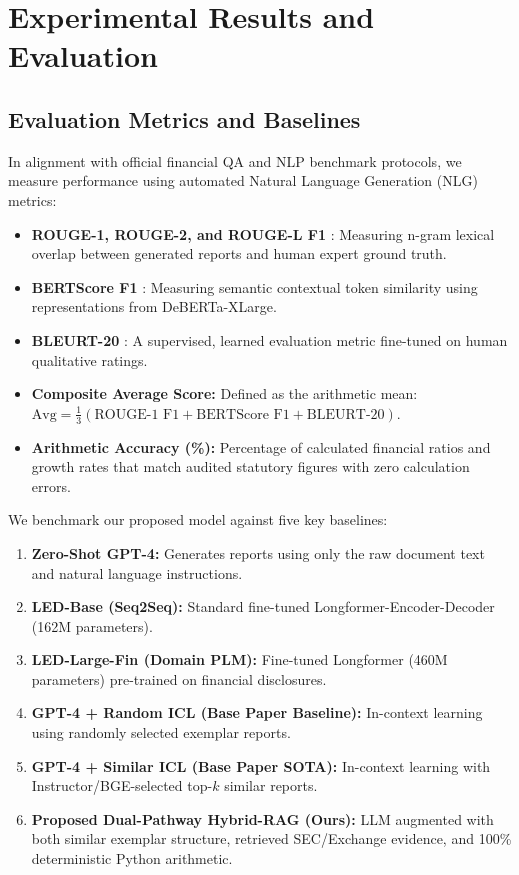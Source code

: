 \documentclass[conference]{IEEEtran}
\begin{document}
\section{Experimental Results and Evaluation}

\subsection{Evaluation Metrics and Baselines}
In alignment with official financial QA and NLP benchmark protocols, we measure performance using automated Natural Language Generation (NLG) metrics:
\begin{itemize}
    \item \textbf{ROUGE-1, ROUGE-2, and ROUGE-L F1} \cite{lin2004rouge}: Measuring n-gram lexical overlap between generated reports and human expert ground truth.
    \item \textbf{BERTScore F1} \cite{zhang2020bertscore}: Measuring semantic contextual token similarity using representations from DeBERTa-XLarge.
    \item \textbf{BLEURT-20} \cite{sellam2020bleurt}: A supervised, learned evaluation metric fine-tuned on human qualitative ratings.
    \item \textbf{Composite Average Score:} Defined as the arithmetic mean: $\text{Avg} = \frac{1}{3}(\text{ROUGE-1 F1} + \text{BERTScore F1} + \text{BLEURT-20})$.
    \item \textbf{Arithmetic Accuracy (\%):} Percentage of calculated financial ratios and growth rates that match audited statutory figures with zero calculation errors.
\end{itemize}

We benchmark our proposed model against five key baselines:
\begin{enumerate}
    \item \textbf{Zero-Shot GPT-4:} Generates reports using only the raw document text and natural language instructions.
    \item \textbf{LED-Base (Seq2Seq):} Standard fine-tuned Longformer-Encoder-Decoder (162M parameters).
    \item \textbf{LED-Large-Fin (Domain PLM):} Fine-tuned Longformer (460M parameters) pre-trained on financial disclosures.
    \item \textbf{GPT-4 + Random ICL (Base Paper Baseline):} In-context learning using randomly selected exemplar reports.
    \item \textbf{GPT-4 + Similar ICL (Base Paper SOTA):} In-context learning with Instructor/BGE-selected top-$k$ similar reports.
    \item \textbf{Proposed Dual-Pathway Hybrid-RAG (Ours):} LLM augmented with both similar exemplar structure, retrieved SEC/Exchange evidence, and 100\% deterministic Python arithmetic.
\end{enumerate}
\end{document}
